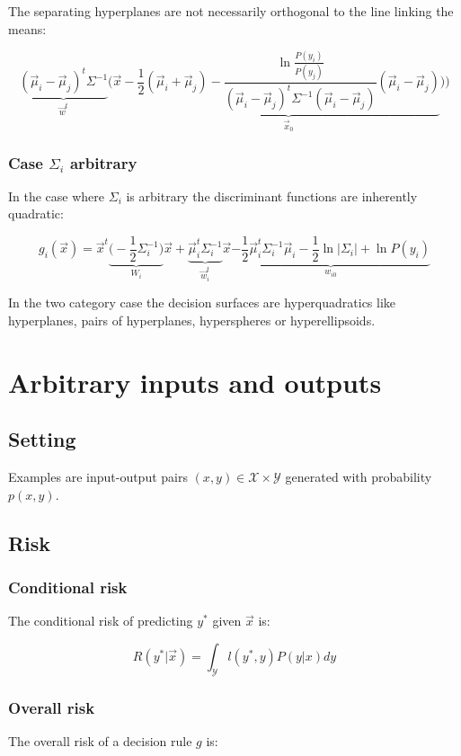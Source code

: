 		The separating hyperplanes are not necessarily orthogonal to the line linking the means:

		$$\underbrace{(\vec{\mu}_i - \vec{\mu}_j)^t\Sigma^{-1}}_{\vec{w}^t}\biggl(\vec{x}-\underbrace{\frac{1}{2}(\vec{\mu}_i+\vec{\mu}_j) - \frac{\ln \frac{P(y_i)}{P(y_j)}}{(\vec{\mu}_i - \vec{\mu}_j)^t\Sigma^{-1}(\vec{\mu}_i-\vec{\mu}_j)}(\vec{\mu}_i-\vec{\mu}_j)}_{\vec{x}_0}\biggr))$$

		\subsubsection{Case $\Sigma_i$ arbitrary}
		In the case where $\Sigma_i$ is arbitrary the discriminant functions are inherently quadratic:

		$$g_i(\vec{x}) = \vec{x}^t\underbrace{\biggl(-\frac{1}{2}\Sigma^{-1}_i\biggr)}_{W_i}\vec{x} + \underbrace{\vec{\mu}_i^t\Sigma_i^{-1}}_{\vec{w}_i^t}\vec{x} \underbrace{-\frac{1}{2}\vec{\mu}_i^t\Sigma_i^{-1}\vec{\mu}_i - \frac{1}{2}\ln|\Sigma_i| + \ln P(y_i)}_{w_{i0}}$$

		In the two category case the decision surfaces are hyperquadratics like hyperplanes, pairs of hyperplanes, hyperspheres or hyperellipsoids.

\section{Arbitrary inputs and outputs}

	\subsection{Setting}
	Examples are input-output pairs $(x, y)\in\mathcal{X}\times\mathcal{Y}$ generated with probability $p(x, y)$.

	\subsection{Risk}

		\subsubsection{Conditional risk}
		The conditional risk of predicting $y^*$ given $\vec{x}$ is:

		$$R(y^*|\vec{x}) = \int_\mathcal{Y}l(y^*, y)P(y|x)dy$$

		\subsubsection{Overall risk}
		The overall risk of a decision rule $g$ is:

